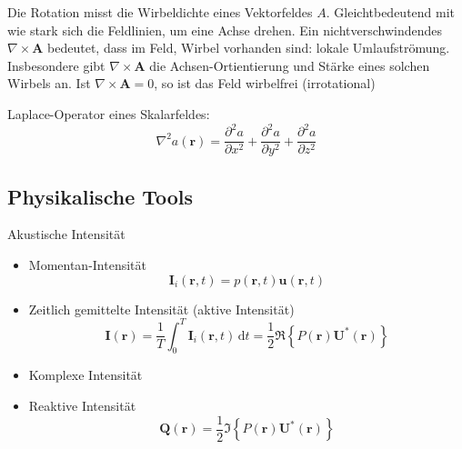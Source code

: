 
Die Rotation misst die Wirbeldichte eines Vektorfeldes $A$. Gleichtbedeutend mit wie stark sich die Feldlinien, um eine Achse drehen. Ein nichtverschwindendes $\nabla\times \mathbf{A}$ bedeutet, dass im Feld, Wirbel vorhanden sind: lokale Umlaufströmung. Insbesondere gibt $\nabla\times \mathbf{A}$ die Achsen-Ortientierung und Stärke eines solchen Wirbels an. Ist $\nabla\times \mathbf{A}=0$, so ist das Feld wirbelfrei (irrotational)


Laplace-Operator eines Skalarfeldes:
\begin{equation}
\nabla^2 a(\mathbf{r}) = \frac{\partial^2 a}{\partial x^2} + \frac{\partial^2 a}{\partial y^2} + \frac{\partial^2 a}{\partial z^2}
\end{equation}


\subsection{Physikalische Tools}

Akustische Intensität

\begin{itemize}
	\item Momentan-Intensität \\
			\begin{equation}
				\mathbf{I}_i(\mathbf{r},t) = p(\mathbf{r},t)\mathbf{u}(\mathbf{r},t)
			\end{equation}
	\item Zeitlich gemittelte Intensität (aktive Intensität) \\
			\begin{equation}
	\mathbf{I}(\mathbf{r}) = \frac{1}{T}\int_0^T \mathbf{I}_i(\mathbf{r},t)\,\mathrm{d}t = \frac{1}{2}\Re\left\{P(\mathbf{r})\mathbf{U}^*(\mathbf{r})\right\}
\end{equation}

	\item Komplexe Intensität
	\item Reaktive Intensität
	\begin{equation}
\mathbf{Q}(\mathbf{r}) = \frac{1}{2}\Im\left\{P(\mathbf{r})\mathbf{U}^*(\mathbf{r})\right\}
\end{equation}

\end{itemize}
